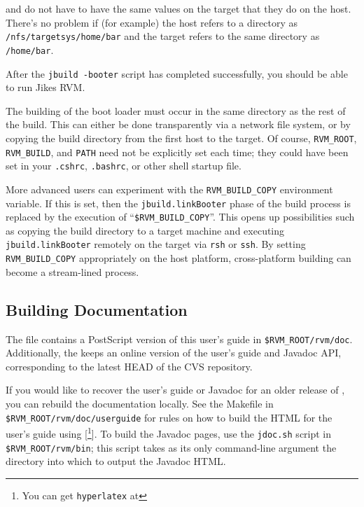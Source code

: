  and  do not have to have the
same values on the target that they do on the host.   There's no
problem if (for example) the host refers to a directory as
\texttt{/nfs/\-tar\-get\-sys/\-home/\-bar} and the target refers to the same
directory as \texttt{/home/\-bar}.

After the \texttt{jbuild -booter} script has completed successfully, you should be able 
to run Jikes RVM.\@ 

The building of the boot loader must occur in the same directory as
the rest of the build.  This can either be done transparently via a
network file system, or by copying the build directory from the first
host to the target.  Of course, \texttt{RVM\_\-ROOT}, \texttt{RVM\-\_\-BUILD},
and \texttt{PATH} need not be explicitly set each time; they could
have been set in your \texttt{.cshrc}, \texttt{.bashrc}, or other
shell startup file. 

More advanced users can experiment with the \texttt{RVM\_BUILD\_COPY}
environment variable.  If this is set, then the 
\texttt{jbuild.linkBooter} phase of the build process is replaced by the
execution of ``\texttt{\$RVM\-\_\-BUILD\_COPY}''.  This opens up 
possibilities such as copying the build directory to a target
machine and executing \texttt{jbuild.linkBooter} remotely on the target
via \texttt{rsh} or \texttt{ssh}.  By setting \texttt{RVM\_BUILD\_COPY}
appropriately on the host platform, cross-platform building can become
a stream-lined process.

\subsection{Building Documentation}

The \texttt{\RVMTarFile} file contains a PostScript\Rweb{} version of this user's guide
in \texttt{\$RVM\_\-ROOT/rvm/doc}.  Additionally, the 
 keeps an online version of
the user's guide and Javadoc\TMweb{} API, corresponding to the latest HEAD of the CVS
repository.

If you would like to recover the user's guide or Javadoc for an older release
of \jrvm{}, you can rebuild the documentation locally.  See the Makefile in
\texttt{\$RVM\_\-ROOT/rvm/doc/userguide} for rules on how to build the
HTML for the user's guide using
[\footnote{You can get \texttt{hyperlatex}
    at \texttt{\HyperlatexURL}}]{\HyperlatexURL}.  To build the
Javadoc pages, use 
the \texttt{jdoc.sh} script in \texttt{\$RVM\_\-ROOT/rvm/bin}; this
script takes as its only command-line argument the directory into
which to output the Javadoc HTML.\@ 

